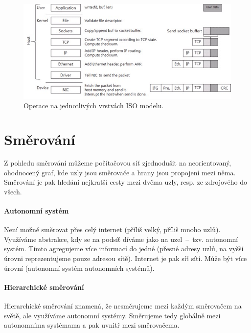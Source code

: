 \begin{figure}[H]
    \centering
    \includegraphics[width=1\linewidth]{operation_process_by_each_layer.png}
    \caption{Operace na jednotlivých vrstvách ISO modelu.}
\end{figure}


\section{Směrování}

Z pohledu směrování můžeme počítačovou síť zjednodušit na neorientovaný, ohodnocený graf, kde uzly jsou směrovače a hrany jsou propojení mezi něma. Směrování je pak hledání nejkratší cesty mezi dvěma uzly, resp. ze zdrojového do všech.

\paragraph*{Autonomní systém} Není možné směrovat přes celý internet (příliš velký, příliš mnoho uzlů). Využíváme abstrakce, kdy se na podsíť díváme jako na uzel~--~tzv. autonomní systém. Tímto agregujeme více informací do jedné (přesné adresy uzlů, na vyšší úrovni reprezentujeme pouze adresou sítě). Internet je pak síť sítí. Může být více úrovní (autonomní systém autonomních systémů).

\paragraph*{Hierarchické směrování} Hierarchické směrování znamená, že nesměrujeme mezi každým směrovačem na světě, ale využíváme autonomní systémy. Směrujeme tedy globálně mezi autonomníma systémama a pak uvnitř mezi směrovačema.

